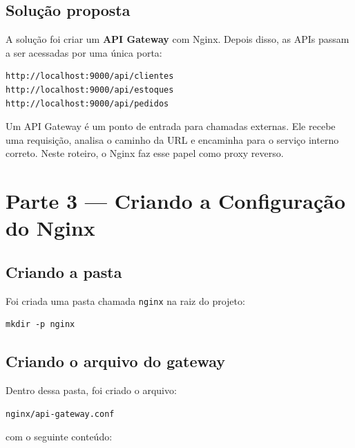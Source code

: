 \documentclass[12pt,a4paper]{article}
\begin{document}
\subsection{Solu\c{c}\~ao proposta}

A solu\c{c}\~ao foi criar um \textbf{API Gateway} com Nginx. Depois disso, as APIs passam a ser acessadas por uma \'unica porta:

\begin{lstlisting}[style=terminal]
http://localhost:9000/api/clientes
http://localhost:9000/api/estoques
http://localhost:9000/api/pedidos
\end{lstlisting}

\begin{infobox}
  Um API Gateway \'e um ponto de entrada para chamadas externas. Ele recebe uma requisi\c{c}\~ao, analisa o caminho da URL e encaminha para o servi\c{c}o interno correto. Neste roteiro, o Nginx faz esse papel como proxy reverso.
\end{infobox}

\section{Parte 3 --- Criando a Configura\c{c}\~ao do Nginx}

\subsection{Criando a pasta}

Foi criada uma pasta chamada \texttt{nginx} na raiz do projeto:

\begin{lstlisting}[style=terminal]
mkdir -p nginx
\end{lstlisting}

\subsection{Criando o arquivo do gateway}

Dentro dessa pasta, foi criado o arquivo:

\begin{lstlisting}[style=terminal]
nginx/api-gateway.conf
\end{lstlisting}

com o seguinte conte\'udo:
\end{document}
